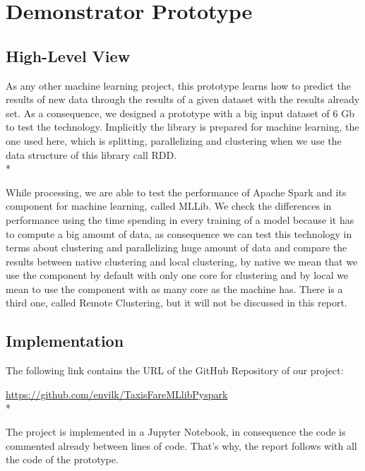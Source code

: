 \section{Demonstrator Prototype}
\label{sec:prototype}
  

\subsection{High-Level View}
As any other machine learning project, this prototype learns how to predict the results of new data through the results of a given dataset with the results already set. As a consequence, we designed a prototype with a big input dataset of 6 Gb to test the technology. Implicitly the library is prepared for machine learning, the one used here, which is splitting, parallelizing and clustering when we use the data structure of this library call RDD.\\*

While processing, we are able to test the performance of Apache Spark and its component for machine learning, called MLLib. 
We check the differences in performance using the time spending in every training of a model because it has to compute a big amount of data, as consequence we can test this technology in terms about clustering and parallelizing huge amount of data and compare the results between native clustering and local clustering, by native we mean that we use the component by default with only one core for clustering and by local we mean to use the component with as many core as the machine has. There is a third one, called Remote Clustering, but it will not be discussed in this report.

\subsection{Implementation}

The following link contains the URL of the GitHub Repository of our project:
\begin{center}
	\url{https://github.com/envilk/TaxisFareMLlibPyspark}\\*
\end{center}			
						
The project is implemented in a Jupyter Notebook, in consequence the code is commented already between lines of code. That's why, the report follows with all the code of the prototype.
		
